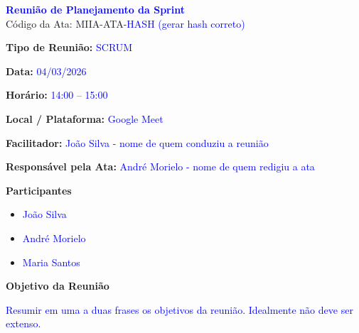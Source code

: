 \documentclass[12pt,a4paper]{article}
\newcommand{\meetingtitle}{}
\newcommand{\meetingtype}{}
\newcommand{\meetingdate}{}
\newcommand{\meetingtime}{}
\newcommand{\meetinglocation}{}
\newcommand{\facilitator}{}
\newcommand{\notetaker}{}
\newcommand{\participants}{}
\newcommand{\meetingobjective}{}
\newcommand{\meetingcode}{}
\newcommand{\companyname}{}
\newcommand{\setmeetingtitle}[1]{\renewcommand{\meetingtitle}{#1}}
\newcommand{\setmeetingtype}[1]{\renewcommand{\meetingtype}{#1}}
\newcommand{\setmeetingdate}[1]{\renewcommand{\meetingdate}{#1}}
\newcommand{\setmeetingtime}[1]{\renewcommand{\meetingtime}{#1}}
\newcommand{\setmeetinglocation}[1]{\renewcommand{\meetinglocation}{#1}}
\newcommand{\setfacilitator}[1]{\renewcommand{\facilitator}{#1}}
\newcommand{\setnotetaker}[1]{\renewcommand{\notetaker}{#1}}
\newcommand{\setparticipants}[1]{\renewcommand{\participants}{#1}}
\newcommand{\setobjective}[1]{\renewcommand{\meetingobjective}{#1}}
\newcommand{\setmeetingcode}[1]{\renewcommand{\meetingcode}{#1}}
\newcommand{\setcompanyname}[1]{\renewcommand{\companyname}{#1}}
\begin{document}
\setmeetingcode{MIIA-ATA-\textcolor{blue}{HASH (gerar hash correto)}}

\setmeetingtitle{\textcolor{blue}{Reunião de Planejamento da Sprint}}
\setmeetingtype{\textcolor{blue}{SCRUM}}
\setmeetingdate{\textcolor{blue}{04/03/2026}}
\setmeetingtime{\textcolor{blue}{14:00 -- 15:00}}
\setmeetinglocation{\textcolor{blue}{Google Meet}}
\setfacilitator{\textcolor{blue}{João Silva - nome de quem conduziu a reunião}}
\setnotetaker{\textcolor{blue}{André Morielo - nome de quem redigiu a ata}}
\setcompanyname{Instituto de Estudos Avançados (IEAv)}

\setparticipants{
\begin{itemize}
\item \textcolor{blue}{João Silva}
\item \textcolor{blue}{André Morielo}
\item \textcolor{blue}{Maria Santos}
\end{itemize}
}

\setobjective{\textcolor{blue}{Resumir em uma a duas frases os objetivos da reunião. Idealmente não deve ser extenso.}}


\begin{center}
{\Large \textbf{\meetingtitle}}\\
\vspace{0.3em}
{\small Código da Ata: \meetingcode}
\end{center}

\vspace{1em}

\textbf{Tipo de Reunião:} \meetingtype

\textbf{Data:} \meetingdate

\textbf{Horário:} \meetingtime

\textbf{Local / Plataforma:} \meetinglocation

\textbf{Facilitador:} \facilitator

\textbf{Responsável pela Ata:} \notetaker

\vspace{1em}

\textbf{Participantes}

\participants

\vspace{1em}

\textbf{Objetivo da Reunião}

\meetingobjective
\end{document}

